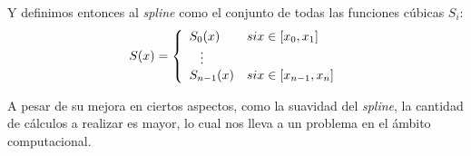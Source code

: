 Y definimos entonces al \emph{spline} como el conjunto de todas las funciones cúbicas $S_i$:
$$
S(x) = 
\left\{
    \begin{array}{ll}
        S_0(x)  & \mbox{si } x \in [x_{0}, x_1] \\
        \hspace{0.3cm}\vdots \\     
        S_{n - 1}(x) & \mbox{si } x \in [x_{n - 1}, x_n]
    \end{array}
\right.
$$


A pesar de su mejora en ciertos aspectos, como la suavidad del \emph{spline}, la cantidad de c\'alculos a realizar es mayor, lo cual nos lleva a un problema en el \'ambito computacional.
